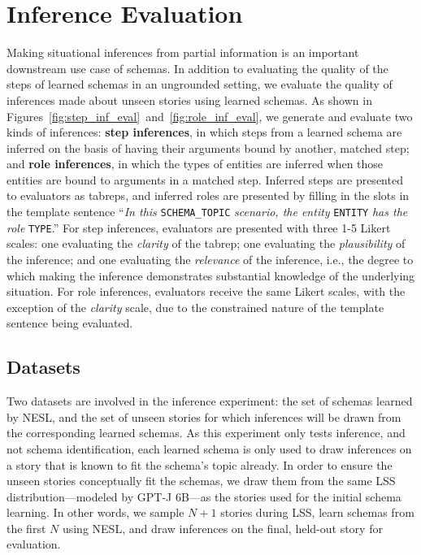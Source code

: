 \section{Inference Evaluation}
\label{sec:inf_eval}

Making situational inferences from partial information is an important downstream use case of schemas. In addition to evaluating the quality of the steps of learned schemas in an ungrounded setting, we evaluate the quality of inferences made about unseen stories using learned schemas. As shown in Figures~\ref{fig:step_inf_eval}~and~\ref{fig:role_inf_eval}, we generate and evaluate two kinds of inferences: \textbf{step inferences}, in which steps from a learned schema are inferred on the basis of having their arguments bound by another, matched step; and \textbf{role inferences}, in which the types of entities are inferred when those entities are bound to arguments in a matched step. Inferred steps are presented to evaluators as tabreps, and inferred roles are presented by filling in the slots in the template sentence ``\textit{In this} \texttt{SCHEMA\_TOPIC} \textit{scenario, the entity} \texttt{ENTITY} \textit{has the role} \texttt{TYPE}.'' For step inferences, evaluators are presented with three 1-5 Likert scales: one evaluating the \textit{clarity} of the tabrep; one evaluating the \textit{plausibility} of the inference; and one evaluating the \textit{relevance} of the inference, i.e., the degree to which making the inference demonstrates substantial knowledge of the underlying situation. For role inferences, evaluators receive the same Likert scales, with the exception of the \textit{clarity} scale, due to the constrained nature of the template sentence being evaluated.


\FloatBarrier
\subsection{Datasets}
Two datasets are involved in the inference experiment: the set of schemas learned by NESL, and the set of unseen stories for which inferences will be drawn from the corresponding learned schemas. As this experiment only tests inference, and not schema identification, each learned schema is only used to draw inferences on a story that is known to fit the schema's topic already. In order to ensure the unseen stories conceptually fit the schemas, we draw them from the same LSS distribution---modeled by GPT-J 6B---as the stories used for the initial schema learning. In other words, we sample $N+1$ stories during LSS, learn schemas from the first $N$ using NESL, and draw inferences on the final, held-out story for evaluation.

